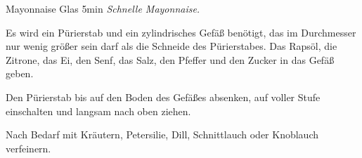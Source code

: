 \documentclass[../recipe-collections/cooking.tex]{subfiles}
\begin{document}
\begin{recipe}{Mayonnaise}{ Glas }{5min }
  \freeform{}\textit{Schnelle Mayonnaise.}


  Es wird ein Pürierstab und ein zylindrisches Gefäß benötigt, das im Durchmesser nur wenig größer sein darf als die Schneide des Pürierstabes.
  Das Rapsöl, die Zitrone, das Ei, den Senf, das Salz, den Pfeffer und den Zucker in das Gefäß geben.

  \newstep{}Den Pürierstab bis auf den Boden des Gefäßes absenken, auf voller Stufe einschalten und langsam nach oben ziehen.

  \newstep{}Nach Bedarf mit Kräutern, Petersilie, Dill, Schnittlauch oder Knoblauch verfeinern.

  \freeform{}\hrulefill{}

\end{recipe}
\end{document}
